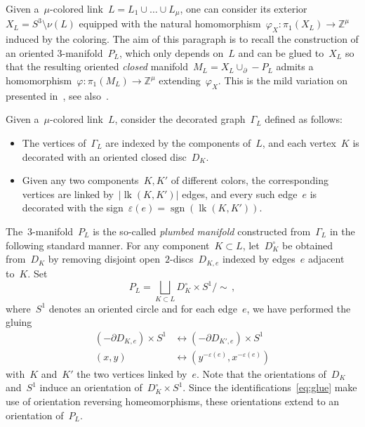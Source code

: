 \documentclass{amsart}
\newcommand{\Z}{\mathbb{Z}}
\DeclareMathOperator{\lk}{lk}
\newcommand{\sgn}{\operatorname{sgn}}
\theoremstyle{definition}
\theoremstyle{remark}
\begin{document}
	Given a~$\mu$-colored link~$L=L_1\cup\dots\cup L_\mu$, one can consider its exterior~$X_L=S^3\setminus\nu(L)$ equipped with
	the natural homomorphism~$\varphi_X\colon\pi_1(X_L)\to\Z^\mu$ induced by the coloring. The aim of this paragraph is to recall the construction of an oriented $3$-manifold~$P_L$, which only depends on~$L$ and can
	be glued to~$X_L$ so that the resulting oriented {\em closed\/} manifold~$M_L=X_L\cup_\partial -P_L$ admits a homomorphism~$\varphi\colon\pi_1(M_L)\to\Z^\mu$ extending~$\varphi_X$.
	This is the mild variation on~\cite[Construction~4.17]{Tof20} presented in~\cite{CMP23}, see also~\cite{CNT}.
	
	\medskip
	
	Given a~$\mu$-colored link~$L$, %
	consider the decorated graph~$\Gamma_L$ defined as follows:
	\begin{itemize}
	\item %
	The vertices of~$\Gamma_L$ are indexed by the components of~$L$, and each vertex~$K$ is decorated with an oriented closed disc~$D_K$.
	\item 
	Given any two components~$K,K'$ of different colors, the corresponding vertices are linked by~$\vert\lk(K,K')\vert$ edges, and every such edge~$e$ is decorated with the sign~$\varepsilon(e)=\sgn(\lk(K,K'))$.
	\end{itemize}

 The~3-manifold~$P_L$ is the so-called {\em plumbed manifold\/} constructed from~$\Gamma_L$ in the following standard manner. For any component~$K\subset L$, let~$D_K^\circ$ be obtained from~$D_K$ by removing disjoint open~$2$-discs~$D_{K,e}$ indexed by edges~$e$ adjacent to~$K$. Set
 \[
 P_L=\bigsqcup_{K\subset L}D_K^\circ\times S^1/\sim\,,
 \]
 where~$S^1$ denotes an oriented circle and for each edge~$e$, we have performed the gluing
 \begin{equation}
  \label{eq:glue}
  \begin{aligned}
 (-\partial D_{K,e})\times S^1 &\longleftrightarrow (-\partial D_{K',e})\times S^1\\
 (x,y)&\longleftrightarrow (y^{-\varepsilon(e)},x^{-\varepsilon(e)})
 \end{aligned}
 \end{equation}
with~$K$ and~$K'$ the two vertices linked by~$e$. Note that the orientations of~$D_K$ and~$S^1$
induce an orientation of~$D_K^\circ\times S^1$. Since the identifications~\eqref{eq:glue} make use of orientation
reversing homeomorphisms, these orientations extend to an orientation of~$P_L$.
\end{document}

